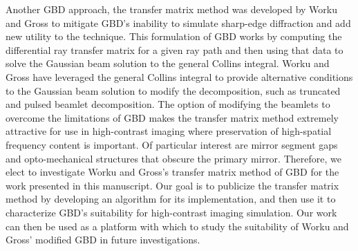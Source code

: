 Another GBD approach, the transfer matrix method was developed by Worku and Gross\cite{worku_vectorial_2017,Worku:18,Worku19} to mitigate GBD's inability to simulate sharp-edge diffraction and add new utility to the technique. This formulation of GBD works by computing the differential ray transfer matrix for a given ray path and then using that data to solve the Gaussian beam solution to the general Collins integral\cite{Collins:70}. Worku and Gross have leveraged the general Collins integral to provide alternative conditions to the Gaussian beam solution to modify the decomposition, such as truncated\cite{Worku19} and pulsed\cite{Worku:20} beamlet decomposition. The option of modifying the  beamlets to overcome the limitations of GBD makes the transfer matrix method extremely attractive for use in high-contrast imaging where preservation of high-spatial frequency content is important. Of particular interest are mirror segment gaps and opto-mechanical structures that obscure the primary mirror. Therefore, we elect to investigate Worku and Gross's transfer matrix method of GBD for the work presented in this manuscript. Our goal is to publicize the transfer matrix method by developing an algorithm for its implementation, and then use it to characterize GBD's suitability for high-contrast imaging simulation. Our work can then be used as a platform with which to study the suitability of Worku and Gross' modified GBD in future investigations.


